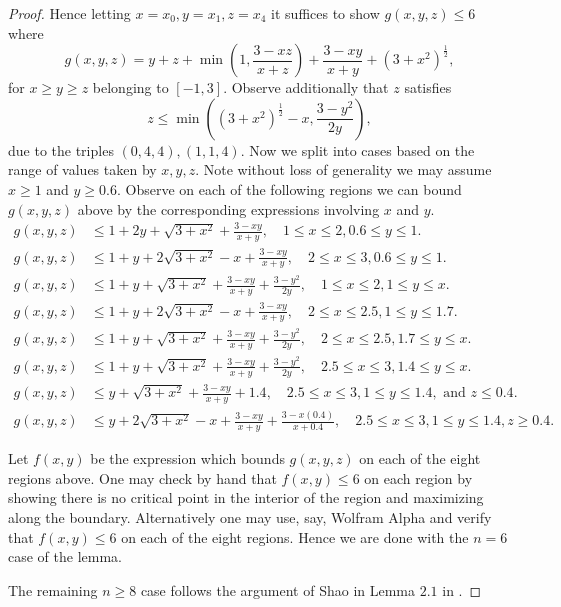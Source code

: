 \documentclass[a4paper,11pt,twoside]{amsart}
\theoremstyle{definition}
\numberwithin{equation}{section}
\begin{document}
\begin{proof}
Hence letting $x = x_0, y = x_1, z = x_4$ it suffices to show $g(x,y,z) \leq 6$ where $$g(x,y,z) = y + z + \min(1,\frac{3-xz}{x+z}) + \frac{3 - xy}{x+y} + (3+x^2)^{\frac{1}{2}},$$ for $x \geq y \geq z$ belonging to $[-1,3]$. Observe additionally that $z$ satisfies $$z \leq 
\min((3+x^2)^{\frac{1}{2}} - x, \frac{3-y^2}{2y}),$$ due to the triples $(0,4,4),(1,1,4).$ 
Now we split into cases based on the range of values taken by $x,y,z$. Note without loss of generality we may assume $x \geq 1$ and $y \geq 0.6.$ Observe on each of the following regions we can bound $g(x,y,z)$ above by the corresponding expressions involving $x$ and $y$.
\begin{align*}
    g(x,y,z) &\leq 1 + 2y + \sqrt{3 + x^2} + \frac{3 - xy}{x+y}, \quad  1 \leq x \leq 2, 0.6 \leq y \leq 1. \\
     g(x,y,z) &\leq 1 + y + 2\sqrt{3 + x^2} - x + \frac{3 - xy}{x+y}, \quad 2 \leq x \leq 3, 0.6 \leq y \leq 1.\\
     g(x,y,z) &\leq  1 + y + \sqrt{3 + x^2} + \frac{3 - xy}{x+y} + \frac{3 - y^2}{2y}, \quad 1 \leq x \leq 2, 1 \leq y \leq x.\\
    g(x,y,z) &\leq 1 + y + 2\sqrt{3 + x^2} - x + \frac{3 - xy}{x+y}, \quad 2 \leq x \leq 2.5, 1 \leq y \leq 1.7.\\
     g(x,y,z) &\leq  1 + y + \sqrt{3 + x^2} + \frac{3 - xy}{x+y} + \frac{3- y^2}{2y}, \quad 2 \leq x \leq 2.5, 1.7 \leq y \leq x.\\
     g(x,y,z) &\leq 1 + y + \sqrt{3 + x^2} + \frac{3 - xy}{x+y} + \frac{3- y^2}{2y}, \quad 2.5 \leq x \leq 3, 1.4 \leq y \leq x.\\
     g(x,y,z) &\leq  y + \sqrt{3 + x^2} + \frac{3 - xy}{x+y} + 1.4, \quad 2.5 \leq x \leq 3, 1 \leq y \leq 1.4, \text{ and } z \leq 0.4.\\
     g(x,y,z) &\leq  y + 2\sqrt{3 + x^2} - x + \frac{3 - xy}{x+y} + \frac{3-x(0.4)}{x + 0.4}, \quad 2.5 \leq x \leq 3, 1 \leq y \leq 1.4, z \geq 0.4.
\end{align*}

Let $f(x,y)$ be the expression which bounds $g(x,y,z)$ on each of the eight regions above. One may check by hand that $f(x,y) \leq 6$ on each region by showing there is no critical point in the interior of the region and maximizing along the boundary. Alternatively one may use, say, Wolfram Alpha and verify that $f(x,y) \leq 6$ on each of the eight regions. Hence we are done with the $n = 6$ case of the lemma.

The remaining $n \geq 8$ case follows the argument of Shao in Lemma $2.1$ in \cite{Shao}.



\end{proof}
\end{document}
